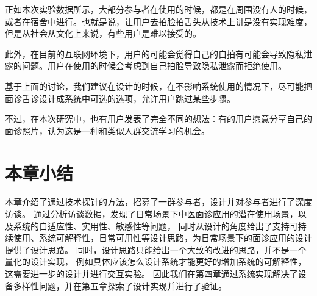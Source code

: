 正如本次实验数据所示，大部分参与者在使用的时候，都是在周围没有人的时候，或者在宿舍中进行。也就是说，让用户去拍脸拍舌头从技术上讲是没有实现难度，但是从社会从文化上来说，有些用户是难以接受的。

此外，在目前的互联网环境下，用户的可能会觉得自己的自拍有可能会导致隐私泄露的问题。用户在使用的时候会考虑到自己拍脸导致隐私泄露而拒绝使用。

基于上面的讨论，我们建议在设计的时候，在不影响系统使用的情况下，尽可能把面诊舌诊设计成系统中可选的选项，允许用户跳过某些步骤。

不过，在本次研究中，也有用户发表了完全不同的想法：有的用户愿意分享自己的面诊照片，认为这是一种和类似人群交流学习的机会。

\section{本章小结}


本章介绍了通过技术探针的方法，招募了一群参与者，设计并对参与者进行了深度访谈。
通过分析访谈数据，发现了日常场景下中医面诊应用的潜在使用场景，以及系统的自适应性、实用性、敏感性等问题，
同时从设计的角度给出了支持可持续使用、系统可解释性，日常可用性等设计思路，为日常场景下的面诊应用的设计提供了设计思路。
同时，设计思路只能给出一个大致的改进的思路，并不是一个量化的设计实现，
例如具体应该怎么设计系统才能更好的增加系统的可解释性，这需要进一步的设计并进行交互实验。
因此我们在第四章通过系统实现解决了设备多样性问题，并在第五章探索了设计实现并进行了验证。

% 










